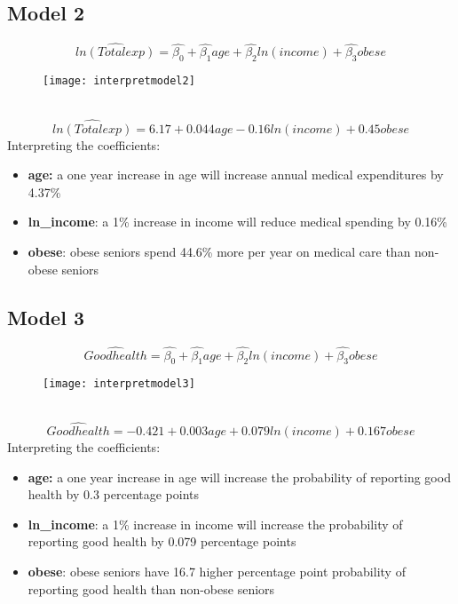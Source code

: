 \documentclass[12pt]{article}
\begin{document}
\subsection*{Model 2}
\begin{equation*}
\widehat{ln(Totalexp)}=\hat{\beta_0}+\hat{\beta_1}age+\hat{\beta_2}ln(income)+\hat{\beta_3}obese	
\end{equation*}
\begin{figure}[h!]
	\texttt{[image: interpretmodel2]}	
\end{figure}\\
\begin{equation*}
\widehat{ln(Totalexp)}=6.17+0.044age-0.16ln(income)+0.45obese	
\end{equation*}
Interpreting the coefficients: 
\begin{itemize}
	\item \textbf{age:} a one year increase in age will increase annual medical expenditures by 4.37\%
	\item \textbf{ln\_income}: a 1\% increase in income will reduce medical spending by 0.16\%
	\item \textbf{obese}: obese seniors spend 44.6\% more per year on medical care than non-obese seniors
\end{itemize}

\clearpage 
\subsection*{Model 3}
\begin{equation*}
\widehat{Goodhealth}=\hat{\beta_0}+\hat{\beta_1}age+\hat{\beta_2}ln(income)+\hat{\beta_3}obese	
\end{equation*}
\begin{figure}[h!]
	\texttt{[image: interpretmodel3]}	
\end{figure}\\
\begin{equation*}
\widehat{Goodhealth}=-0.421+0.003age+0.079ln(income)+0.167obese	
\end{equation*}
Interpreting the coefficients: 
\begin{itemize}
	\item \textbf{age:} a one year increase in age will increase the probability of reporting good health by 0.3 percentage points 
	\item \textbf{ln\_income}: a 1\% increase in income will increase the probability of reporting good health by 0.079 percentage points 
	\item \textbf{obese}: obese seniors have 16.7 higher percentage point probability of reporting good health than non-obese seniors
\end{itemize}
\end{document}
